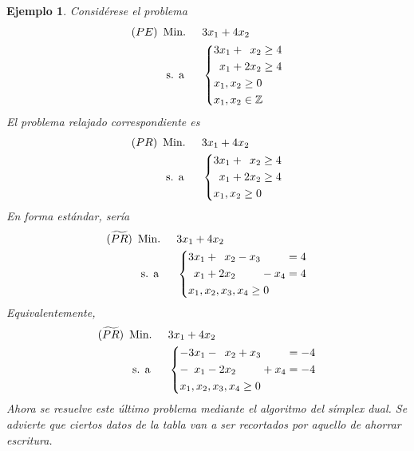 \documentclass[11pt]{report}
\theoremstyle{mytheorem}
\theoremstyle{mydefinition}
\theoremstyle{myexample}
\newtheorem*{example}{Ejemplo}
\newcommand{\Z}{\mathbb Z}
\begin{document}
\begin{example}
Considérese el problema
\[\begin{aligned}[t]
(PE)\ \,&\text{Min. } && 3x_1+4x_2 \\
& \; \text{s. a} &&\left\{\begin{alignedat}{10}
& 3&x_1 & {}+{} &  &x_2 & {}\geq{} &4 \\
&  &x_1 & {}+{} & 2&x_2 & {}\geq{} &4 \\
&\mathrlap{x_1,x_2 \geq 0} \\
&\mathrlap{x_1,x_2 \in \Z}
\end{alignedat}\right.
\end{aligned}\]
El problema relajado correspondiente es
\[\begin{aligned}[t]
(PR)\ \,&\text{Min. } && 3x_1+4x_2 \\
& \; \text{s. a} &&\left\{\begin{alignedat}{10}
& 3&x_1 & {}+{} &  &x_2 & {}\geq{} &4 \\
&  &x_1 & {}+{} & 2&x_2 & {}\geq{} &4 \\
&\mathrlap{x_1,x_2 \geq 0}
\end{alignedat}\right.
\end{aligned}\]
En forma estándar, sería
\[\begin{aligned}[t]
(\widetilde{PR})\ \,&\text{Min. } && 3x_1+4x_2 \\
& \; \text{s. a} &&\left\{\begin{alignedat}{10}
& 3&x_1 & {}+{} &  &x_2 & {}-{} & x_3 &       &     & {}={} &4 \\
&  &x_1 & {}+{} & 2&x_2 &       &     & {}-{} & x_4 & {}={} &4 \\
&\mathrlap{x_1,x_2,x_3,x_4 \geq 0}
\end{alignedat}\right.
\end{aligned}\]
Equivalentemente,
\[\begin{aligned}[t]
(\widetilde{PR})\ \,&\text{Min. } && 3x_1+4x_2 \\
& \; \text{s. a} &&\left\{\begin{alignedat}{10}
& -&3&x_1 & {}-{} &  &x_2 & {}+{} & x_3 &       &     & {}={} &-4 \\
& -& &x_1 & {}-{} & 2&x_2 &       &     & {}+{} & x_4 & {}={} &-4 \\
&\mathrlap{x_1,x_2,x_3,x_4 \geq 0}
\end{alignedat}\right.
\end{aligned}\]
Ahora se resuelve este último problema mediante el algoritmo del símplex dual. Se advierte que ciertos datos de la tabla van a ser recortados por aquello de ahorrar escritura.
\begin{center}
\begin{tabular}{|c|c|c|c|c|}
    \cline{1-5}


\end{tabular}
\end{center}
\end{example}
\end{document}
